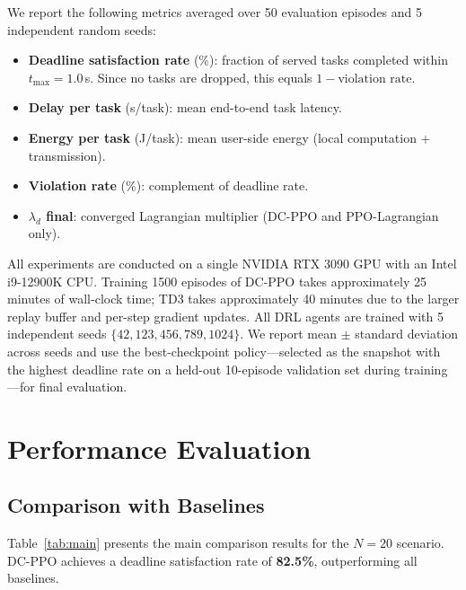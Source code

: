 \documentclass[journal]{IEEEtran}
\begin{document}
We report the following metrics averaged over 50 evaluation episodes
and 5 independent random seeds:

\begin{itemize}
  \item \textbf{Deadline satisfaction rate} (\%): fraction of served
    tasks completed within $t_{\max}{=}1.0$\,s.
    Since no tasks are dropped, this equals $1 - \text{violation rate}$.

  \item \textbf{Delay per task} (s/task): mean end-to-end task latency.

  \item \textbf{Energy per task} (J/task): mean user-side energy
    (local computation + transmission).

  \item \textbf{Violation rate} (\%): complement of deadline rate.

  \item \textbf{$\lambda_d$ final}: converged Lagrangian multiplier
    (DC-PPO and PPO-Lagrangian only).
\end{itemize}

All experiments are conducted on a single NVIDIA RTX 3090
GPU with an Intel i9-12900K CPU.
Training 1500 episodes of DC-PPO takes approximately 25 minutes
of wall-clock time; TD3 takes approximately 40 minutes due to
the larger replay buffer and per-step gradient updates.
All DRL agents are trained with 5 independent seeds
$\{42, 123, 456, 789, 1024\}$.
We report mean $\pm$ standard deviation across seeds and
use the best-checkpoint policy---selected as the snapshot
with the highest deadline rate on a held-out 10-episode
validation set during training---for final evaluation.

\section{Performance Evaluation}\label{sec:results}

\subsection{Comparison with Baselines}

Table~\ref{tab:main} presents the main comparison results for the
$N{=}20$ scenario.
DC-PPO achieves a deadline satisfaction rate of \textbf{82.5\%},
outperforming all baselines.
\end{document}
